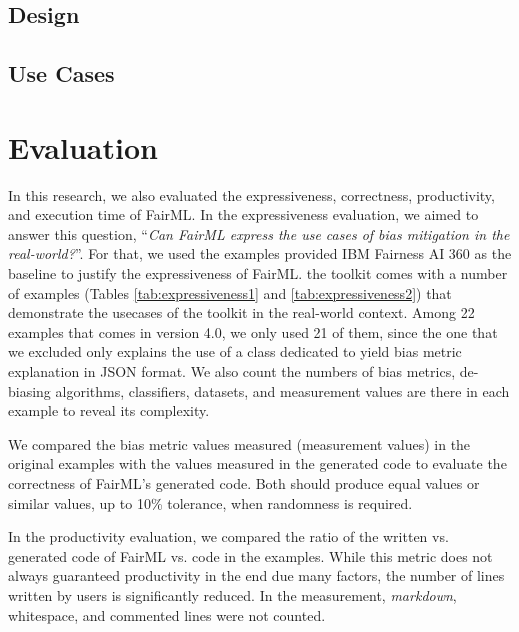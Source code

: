\documentclass[sigconf,review]{acmart}
\begin{document}
\subsection{Design}
\label{sec:design}

\subsection{Use Cases}
\label{sec:use_Cases}

\section{Evaluation}
\label{sec:evaluation}
In this research, we also evaluated the expressiveness, correctness, productivity, and execution time of FairML. In the expressiveness evaluation, we aimed to answer this question, 
``\textit{Can FairML express the use cases of bias mitigation in the real-world?}''. For that, we used the examples provided IBM Fairness AI 360 as the baseline to justify the expressiveness of FairML. 
the toolkit comes with a number of examples (Tables \ref{tab:expressiveness1} and \ref{tab:expressiveness2}) that demonstrate 
the usecases of the toolkit in the real-world context. 
Among 22 examples that comes in version 4.0, we only used 21 of them, 
since the one that we excluded only explains the use of a class dedicated to yield bias metric explanation in JSON format. We also count the numbers of bias metrics, de-biasing algorithms, classifiers, datasets, and measurement values are there in each example to reveal its complexity. 

We compared the bias metric values measured (measurement values) in the original examples with the values measured in the generated code to evaluate the correctness of FairML's generated code. Both should produce equal values or similar values, up to 10\% tolerance, when randomness is required.  


In the productivity evaluation, 
we compared the ratio of the written vs. generated code of FairML vs.
code in the examples. 
While this metric does not always guaranteed productivity in the end due many factors, 
the number of lines written by users is significantly reduced. In the measurement, \textit{markdown}, whitespace, and commented lines were not counted.
\end{document}
